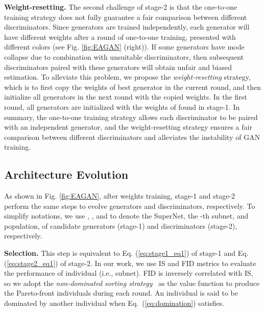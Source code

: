 \documentclass[runningheads]{llncs}
\begin{document}
\textbf{Weight-resetting.} The second challenge of stage-2 is that the one-to-one training strategy does not fully guarantee a fair comparison between different discriminators. Since  generators are trained independently, each generator will have different weights after a round of one-to-one training, presented with different colors (see Fig. \ref{fig:EAGAN} (right)). If some generators have mode collapse due to combination with unsuitable discriminators, then subsequent discriminators paired with these generators will obtain unfair and biased estimation. To alleviate this problem, we propose the \textit{weight-resetting} strategy, which is to first copy the weights of best generator in the current round, and then initialize all generators in the next round with the copied weights. In the first round, all generators are initialized with the weights of  found in stage-1. In summary, the one-to-one training strategy allows each discriminator to be paired with an independent generator, and the weight-resetting strategy ensures a fair comparison between different discriminators and alleviates the instability of GAN training.








\subsection{Architecture Evolution}\label{sec:evolution}












As shown in Fig. \ref{fig:EAGAN}, after weights training, stage-1 and stage-2 perform the same steps to evolve generators and discriminators, respectively. To simplify notations, we use , , and  to denote the SuperNet, the -th subnet, and population, of candidate generators (stage-1) and discriminators (stage-2), respectively.






\textbf{Selection.} This step is equivalent to Eq. (\ref{eq:stage1_eq1}) of stage-1 and Eq. (\ref{eq:stage2_eq1}) of stage-2. In our work, we use IS \cite{IS} and FID \cite{FID} metrics to evaluate the performance of individual (i.e., subnet). FID is inversely correlated with IS, so we adopt the \textit{non-dominated sorting strategy}~\cite{nsga2} as the value function to produce the Pareto-front individuals during each round. An individual  is said to be dominated by another individual   when Eq.~(\ref{eq:domination}) satisfies.
\end{document}
